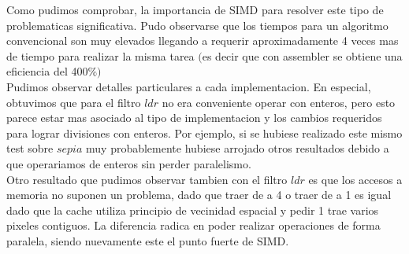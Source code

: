 Como pudimos comprobar, la importancia de SIMD para resolver este tipo de problematicas significativa. 
Pudo observarse que los tiempos para un algoritmo convencional son muy elevados llegando a requerir aproximadamente 4 veces mas de tiempo para realizar la misma tarea $($es decir que con assembler se obtiene una eficiencia del 400$ \% )$\\

Pudimos observar detalles particulares a cada implementacion. En especial, obtuvimos que para el filtro $ldr$ no era conveniente operar con enteros, pero esto parece estar mas asociado al tipo de implementacion y los cambios requeridos para lograr divisiones con enteros. Por ejemplo, si se hubiese realizado este mismo test sobre $sepia$ muy probablemente hubiese arrojado otros resultados debido a que operariamos de enteros sin perder paralelismo.\\

Otro resultado que pudimos observar tambien con el filtro $ldr$ es que los accesos a memoria no suponen un problema, dado que traer de a 4 o traer de a 1 es igual dado que la cache utiliza principio de vecinidad espacial y pedir 1 trae varios pixeles contiguos. La diferencia radica en poder realizar operaciones de forma paralela, siendo nuevamente este el punto fuerte de SIMD. \\


